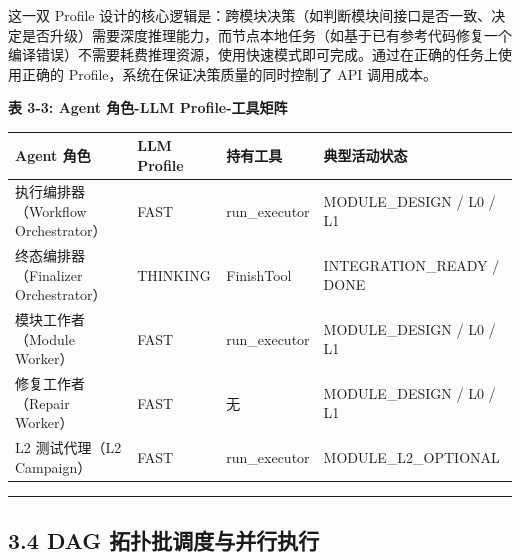 这一双 Profile
设计的核心逻辑是：跨模块决策（如判断模块间接口是否一致、决定是否升级）需要深度推理能力，而节点本地任务（如基于已有参考代码修复一个编译错误）不需要耗费推理资源，使用快速模式即可完成。通过在正确的任务上使用正确的
Profile，系统在保证决策质量的同时控制了 API 调用成本。

\textbf{表 3-3: Agent 角色-LLM Profile-工具矩阵}

{\def\LTcaptype{none} %
\begin{longtable}[]{@{}
  >{\raggedright\arraybackslash}p{}
  >{\raggedright\arraybackslash}p{}
  >{\raggedright\arraybackslash}p{}
  >{\raggedright\arraybackslash}p{}@{}}
\toprule\noalign{}
\begin{minipage}[b]{\linewidth}\raggedright
Agent 角色
\end{minipage} & \begin{minipage}[b]{\linewidth}\raggedright
LLM Profile
\end{minipage} & \begin{minipage}[b]{\linewidth}\raggedright
持有工具
\end{minipage} & \begin{minipage}[b]{\linewidth}\raggedright
典型活动状态
\end{minipage} \\
\midrule\noalign{}
\endhead
\bottomrule\noalign{}
\endlastfoot
执行编排器（Workflow Orchestrator） & FAST & run\_executor &
MODULE\_DESIGN / L0 / L1 \\
终态编排器（Finalizer Orchestrator） & THINKING & FinishTool &
INTEGRATION\_READY / DONE \\
模块工作者（Module Worker） & FAST & run\_executor & MODULE\_DESIGN / L0
/ L1 \\
修复工作者（Repair Worker） & FAST & 无 & MODULE\_DESIGN / L0 / L1 \\
L2 测试代理（L2 Campaign） & FAST & run\_executor &
MODULE\_L2\_OPTIONAL \\
\end{longtable}
}

\begin{center}\rule{0.5\linewidth}{0.5pt}\end{center}

\subsection{3.4 DAG
拓扑批调度与并行执行}\label{dag-ux62d3ux6251ux6279ux8c03ux5ea6ux4e0eux5e76ux884cux6267ux884c}

